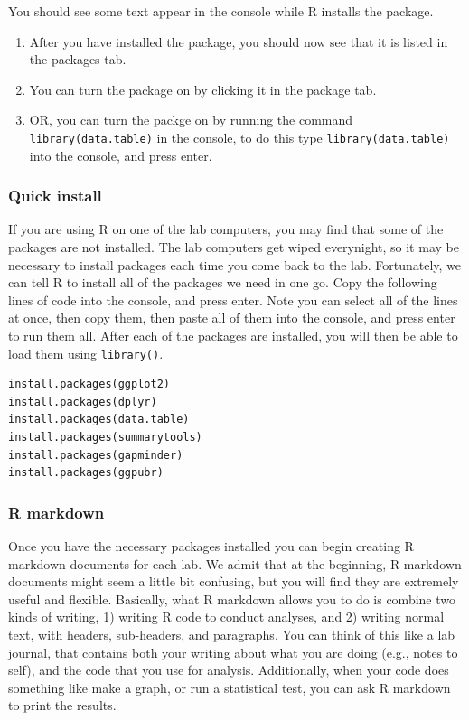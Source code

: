 \documentclass[
]{book}
\providecommand{\tightlist}{%
  \setlength{\itemsep}{0pt}\setlength{\parskip}{0pt}}
\begin{document}
You should see some text appear in the console while R installs the package.

\begin{enumerate}
\def\labelenumi{\arabic{enumi}.}
\setcounter{enumi}{9}
\tightlist
\item
  After you have installed the package, you should now see that it is listed in the packages tab.
\item
  You can turn the package on by clicking it in the package tab.
\item
  OR, you can turn the packge on by running the command \texttt{library(data.table)} in the console, to do this type \texttt{library(data.table)} into the console, and press enter.
\end{enumerate}

\hypertarget{quick-install}{%
\subsubsection{Quick install}\label{quick-install}}

If you are using R on one of the lab computers, you may find that some of the packages are not installed. The lab computers get wiped everynight, so it may be necessary to install packages each time you come back to the lab. Fortunately, we can tell R to install all of the packages we need in one go. Copy the following lines of code into the console, and press enter. Note you can select all of the lines at once, then copy them, then paste all of them into the console, and press enter to run them all. After each of the packages are installed, you will then be able to load them using \texttt{library()}.

\begin{verbatim}
install.packages(ggplot2)
install.packages(dplyr)
install.packages(data.table)
install.packages(summarytools)
install.packages(gapminder)
install.packages(ggpubr)
\end{verbatim}

\hypertarget{r-markdown}{%
\subsubsection{R markdown}\label{r-markdown}}

Once you have the necessary packages installed you can begin creating R markdown documents for each lab. We admit that at the beginning, R markdown documents might seem a little bit confusing, but you will find they are extremely useful and flexible. Basically, what R markdown allows you to do is combine two kinds of writing, 1) writing R code to conduct analyses, and 2) writing normal text, with headers, sub-headers, and paragraphs. You can think of this like a lab journal, that contains both your writing about what you are doing (e.g., notes to self), and the code that you use for analysis. Additionally, when your code does something like make a graph, or run a statistical test, you can ask R markdown to print the results.
\end{document}
